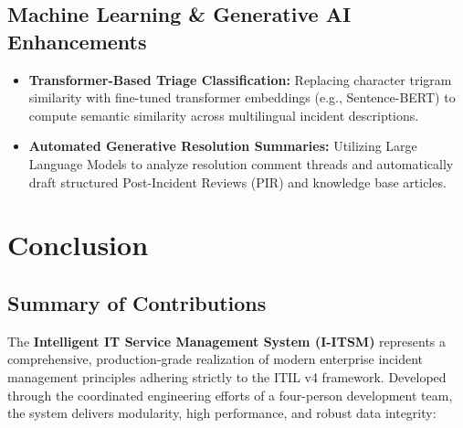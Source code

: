 \documentclass[11pt,a4paper,oneside]{report}
\begin{document}
\section{Machine Learning \& Generative AI Enhancements}
\label{sec:future_ml}
\begin{itemize}
    \item \textbf{Transformer-Based Triage Classification:} Replacing character trigram similarity with fine-tuned transformer embeddings (e.g., Sentence-BERT) to compute semantic similarity across multilingual incident descriptions.
    \item \textbf{Automated Generative Resolution Summaries:} Utilizing Large Language Models to analyze resolution comment threads and automatically draft structured Post-Incident Reviews (PIR) and knowledge base articles.
\end{itemize}


\chapter{Conclusion}
\label{ch:conclusion}

\section{Summary of Contributions}
\label{sec:concl_summary}
The \textbf{Intelligent IT Service Management System (I-ITSM)} represents a comprehensive, production-grade realization of modern enterprise incident management principles adhering strictly to the ITIL v4 framework. Developed through the coordinated engineering efforts of a four-person development team, the system delivers modularity, high performance, and robust data integrity:
\end{document}
